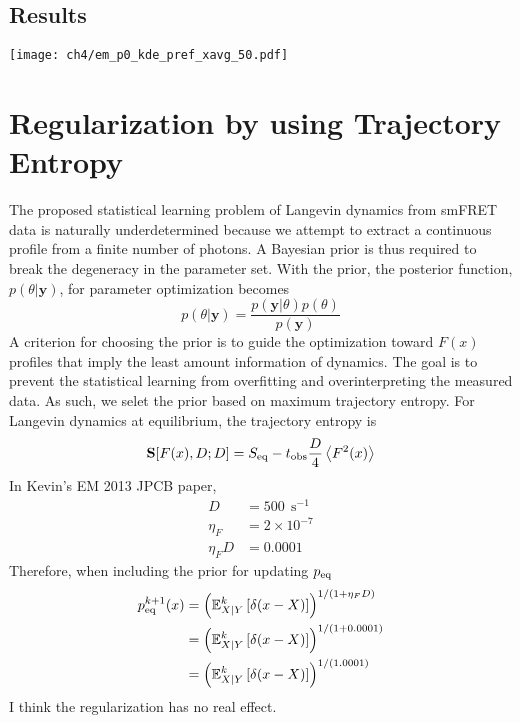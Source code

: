 \subsection{Results}
\begin{center}
    \texttt{[image: ch4/em\_p0\_kde\_pref\_xavg\_50.pdf]} 
\end{center}

\section{Regularization by using Trajectory Entropy}
The proposed statistical learning problem of Langevin dynamics from smFRET data is naturally underdetermined because we attempt to extract a continuous profile from a finite number of photons. A Bayesian prior is thus required to break the degeneracy in the parameter set. With the prior, the posterior function, $p(\theta | \textbf{y})$, for parameter optimization becomes
\begin{equation}
    p(\theta | \textbf{y}) = \frac{p(\textbf{y}|\theta) p(\theta)}{p(\textbf{y})}
\end{equation}
A criterion for choosing the prior is to guide the optimization toward $F(x)$ profiles that imply the least amount information of dynamics. The goal is to prevent the statistical learning from overfitting and overinterpreting the measured data. As such, we selet the prior based on maximum trajectory entropy. For Langevin dynamics at equilibrium, the trajectory entropy is 
\begin{equation}
    \textbf{S}[F(x), D; D] = S_{\rm eq} - t_{\rm obs} \frac{D}{4}\left< F^2(x)\right>
\end{equation}
In Kevin's EM 2013 JPCB paper,
\begin{align}
    D &= 500~~\text{s}^{-1} \\
    \eta_{F} &= 2 \times 10^{-7} \\ 
    \eta_{F}D &= 0.0001
\end{align}
Therefore, when including the prior for updating $p_{\rm eq}$
\begin{align*}
    p_{\rm eq}^{k+1}(x) &= \left(\mathbb{E}^k_{X|Y} \left[\delta(x-X) \right]\right)^{1/(1+\eta_FD)} \\
    &= \left(\mathbb{E}^k_{X|Y} \left[\delta(x-X) \right]\right)^{1/(1+0.0001)} \\
    &= \left(\mathbb{E}^k_{X|Y} \left[\delta(x-X) \right]\right)^{1/(1.0001)}
\end{align*}
I think the regularization has no real effect.

